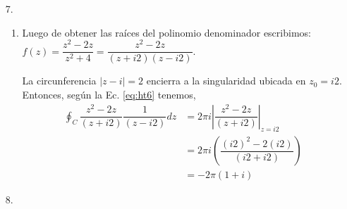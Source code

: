 \documentclass[10pt,a4paper]{article}
\begin{document}
\begin{enumerate}
\item[7.]
\begin{enumerate}
	\item Luego de obtener las ra\'ices del polinomio denominador escribimos: 
	$f(z)=\dfrac{z^2-2z}{z^2+4}=\dfrac{z^2-2z}{(z+i2)(z-i2)}$.
	
	La circunferencia $|z-i|=2$ encierra a la singularidad ubicada en $z_0=i2$. 
	Entonces, seg\'un la Ec. \ref{eq:ht6} tenemos,
	\begin{equation}
	\begin{split}
		\oint_C \dfrac{z^2-2z}{(z+i2)}\dfrac{1}{(z-i2)} dz &= 2\pi i 
		\left| \dfrac{z^2-2z}{(z+i2)} \right|_{z=i2}  \\
		&= 2\pi i \left( \dfrac{(i2)^2-2(i2)}{(i2+i2)} \right)  \\
		&= \boxed{-2\pi (1+i)} 
	\end{split}
	\end{equation}

	
\end{enumerate}

\item [8.]
\begin{enumerate}
\label{ej:sol8a}
	

\end{enumerate}
\end{enumerate}
\end{document}

